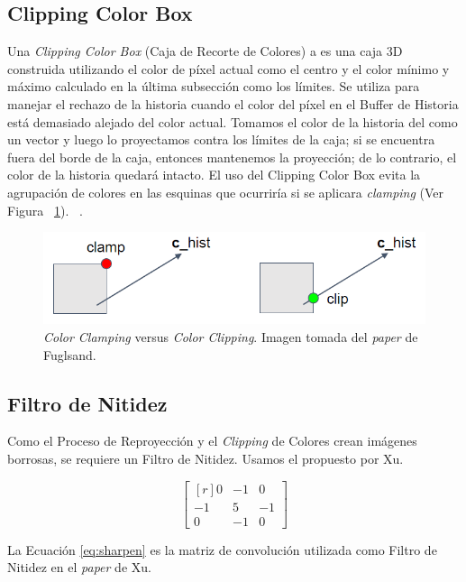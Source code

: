 \documentclass[pregrado]{tesis-usb} %
\begin{document}
\subsection{Clipping Color Box} 
Una \textit{Clipping Color Box} (Caja de Recorte de Colores) a es una caja 3D construida utilizando el color de píxel actual como el centro y el color mínimo y máximo calculado en la última subsección como los límites. Se utiliza para manejar el rechazo de la historia cuando el color del píxel en el Buffer de Historia está demasiado alejado del color actual. Tomamos el color de la historia del como un vector y luego lo proyectamos contra los límites de la caja; si se encuentra fuera del borde de la caja, entonces mantenemos la proyección; de lo contrario, el color de la historia quedará intacto. El uso del Clipping Color Box evita la agrupación de colores en las esquinas que ocurriría si se aplicara \textit{clamping} (Ver Figura ~\ref{fig:clippingbox}). ~\cite{Fuglsand2016}.

\begin{figure}[!hbt]
	\centering
	\includegraphics[scale=0.4]{images/clipping_box.png}
	\caption{\textit{Color Clamping} versus \textit{Color Clipping}. Imagen tomada del \textit{paper} de Fuglsand. \protect\cite{Fuglsand2016}}\label{fig:clippingbox}
\end{figure}


\subsection{Filtro de Nitidez} 
Como el Proceso de Reproyección y el \textit{Clipping} de Colores crean imágenes borrosas, se requiere un Filtro de Nitidez. Usamos el propuesto por Xu. ~\cite{XU2016}

\begin{equation} \label{eq:sharpen}
\begin{bmatrix*}[r]
0 & -1 &  0 \\
-1 &  5 & -1 \\
0 & -1 &  0
\end{bmatrix*}
\end{equation}

La Ecuación \ref{eq:sharpen} es la matriz de convolución utilizada como Filtro de Nitidez en el \textit{paper} de Xu. \protect\cite{XU2016}
\end{document}
